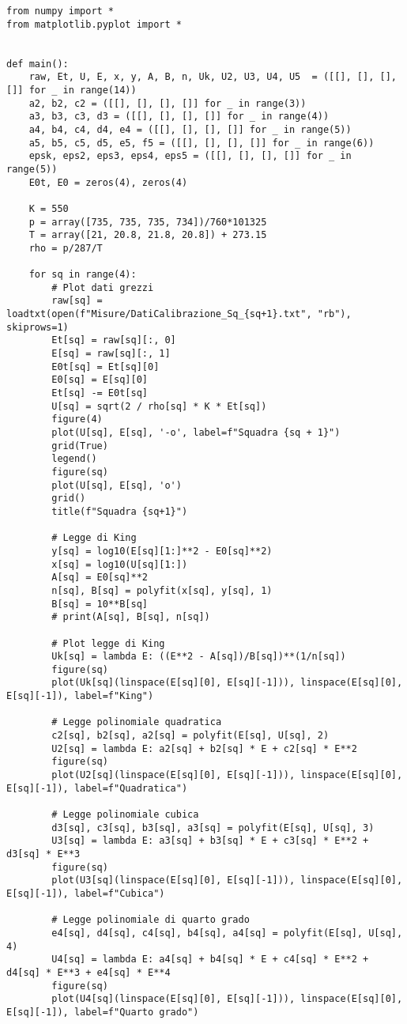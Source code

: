 \begin{lstlisting}
from numpy import *
from matplotlib.pyplot import *


def main():
    raw, Et, U, E, x, y, A, B, n, Uk, U2, U3, U4, U5  = ([[], [], [], []] for _ in range(14))
    a2, b2, c2 = ([[], [], [], []] for _ in range(3))
    a3, b3, c3, d3 = ([[], [], [], []] for _ in range(4))
    a4, b4, c4, d4, e4 = ([[], [], [], []] for _ in range(5))
    a5, b5, c5, d5, e5, f5 = ([[], [], [], []] for _ in range(6))
    epsk, eps2, eps3, eps4, eps5 = ([[], [], [], []] for _ in range(5))
    E0t, E0 = zeros(4), zeros(4)

    K = 550
    p = array([735, 735, 735, 734])/760*101325
    T = array([21, 20.8, 21.8, 20.8]) + 273.15
    rho = p/287/T

    for sq in range(4):
        # Plot dati grezzi
        raw[sq] = loadtxt(open(f"Misure/DatiCalibrazione_Sq_{sq+1}.txt", "rb"), skiprows=1)
        Et[sq] = raw[sq][:, 0]
        E[sq] = raw[sq][:, 1]
        E0t[sq] = Et[sq][0]
        E0[sq] = E[sq][0]
        Et[sq] -= E0t[sq]
        U[sq] = sqrt(2 / rho[sq] * K * Et[sq])
        figure(4)
        plot(U[sq], E[sq], '-o', label=f"Squadra {sq + 1}")
        grid(True)
        legend()
        figure(sq)
        plot(U[sq], E[sq], 'o')
        grid()
        title(f"Squadra {sq+1}")

        # Legge di King
        y[sq] = log10(E[sq][1:]**2 - E0[sq]**2)
        x[sq] = log10(U[sq][1:])
        A[sq] = E0[sq]**2
        n[sq], B[sq] = polyfit(x[sq], y[sq], 1)
        B[sq] = 10**B[sq]
        # print(A[sq], B[sq], n[sq])

        # Plot legge di King
        Uk[sq] = lambda E: ((E**2 - A[sq])/B[sq])**(1/n[sq])
        figure(sq)
        plot(Uk[sq](linspace(E[sq][0], E[sq][-1])), linspace(E[sq][0], E[sq][-1]), label=f"King")

        # Legge polinomiale quadratica
        c2[sq], b2[sq], a2[sq] = polyfit(E[sq], U[sq], 2)
        U2[sq] = lambda E: a2[sq] + b2[sq] * E + c2[sq] * E**2
        figure(sq)
        plot(U2[sq](linspace(E[sq][0], E[sq][-1])), linspace(E[sq][0], E[sq][-1]), label=f"Quadratica")

        # Legge polinomiale cubica
        d3[sq], c3[sq], b3[sq], a3[sq] = polyfit(E[sq], U[sq], 3)
        U3[sq] = lambda E: a3[sq] + b3[sq] * E + c3[sq] * E**2 + d3[sq] * E**3
        figure(sq)
        plot(U3[sq](linspace(E[sq][0], E[sq][-1])), linspace(E[sq][0], E[sq][-1]), label=f"Cubica")

        # Legge polinomiale di quarto grado
        e4[sq], d4[sq], c4[sq], b4[sq], a4[sq] = polyfit(E[sq], U[sq], 4)
        U4[sq] = lambda E: a4[sq] + b4[sq] * E + c4[sq] * E**2 + d4[sq] * E**3 + e4[sq] * E**4
        figure(sq)
        plot(U4[sq](linspace(E[sq][0], E[sq][-1])), linspace(E[sq][0], E[sq][-1]), label=f"Quarto grado")


\end{lstlisting}
